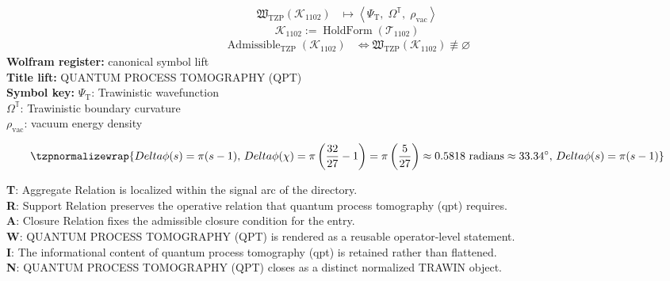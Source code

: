 \noindent
\begin{minipage}[t]{0.48\linewidth}
\begingroup
\small
\[
\begin{aligned}
\mathfrak{W}_{\mathrm{TZP}}\!\left(\mathcal{K}_{1102}\right)
&\longmapsto
\left\langle \Psi_{\mathrm{T}},\; \Omega^{\mathbb{T}},\; \rho_{\mathrm{vac}} \right\rangle
\end{aligned}
\]
\[
\mathcal{K}_{1102}
:=
\operatorname{HoldForm}\!\left(\mathcal{T}_{1102}\right)
\]
\[
\begin{aligned}
\operatorname{Admissible}_{\mathrm{TZP}}\!\left(\mathcal{K}_{1102}\right)
&\Longleftrightarrow
\mathfrak{W}_{\mathrm{TZP}}\!\left(\mathcal{K}_{1102}\right)\not\equiv\varnothing
\end{aligned}
\]
\textbf{Wolfram register:} canonical symbol lift\\
\textbf{Title lift:} QUANTUM PROCESS TOMOGRAPHY (QPT)\\
\textbf{Symbol key:} \(\Psi_{\mathrm{T}}\): Trawinistic wavefunction\\ \(\Omega^{\mathbb{T}}\): Trawinistic boundary curvature\\ \(\rho_{\mathrm{vac}}\): vacuum energy density
\par
\endgroup
\end{minipage}\hfill
\begin{minipage}[t]{0.48\linewidth}
\[
\tzpnormalizewrap{Delta\phi(s) = \pi(s - 1),\,Delta\phi(\chi) = \pi\left(\frac{32}{27} - 1\right) = \pi\left(\frac{5}{27}\right) \approx 0.5818 \text{ radians} \approx 33.34^\circ,\,Delta\phi(s) = \pi(s - 1)}
\]

\small
\textbf{T}: Aggregate Relation is localized within the signal arc of the directory.\\
\textbf{R}: Support Relation preserves the operative relation that quantum process tomography (qpt) requires.\\
\textbf{A}: Closure Relation fixes the admissible closure condition for the entry.\\
\textbf{W}: QUANTUM PROCESS TOMOGRAPHY (QPT) is rendered as a reusable operator-level statement.\\
\textbf{I}: The informational content of quantum process tomography (qpt) is retained rather than flattened.\\
\textbf{N}: QUANTUM PROCESS TOMOGRAPHY (QPT) closes as a distinct normalized TRAWIN object.
\normalsize
\end{minipage}

